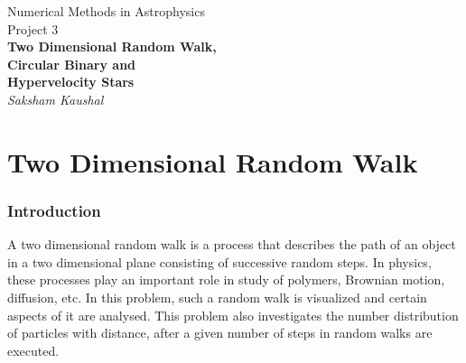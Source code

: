 \documentclass[a4paper]{article}
\begin{document}
	
	
	\begin{titlepage}
		\begin{center}
			\Large Numerical Methods in Astrophysics \\
			\vspace{1cm}
			\huge{
				Project 3 \\
				\vspace{0.5cm}
				\textbf{Two Dimensional Random Walk,}\\
				\textbf{Circular Binary and} \\
				\textbf{Hypervelocity Stars} \\
				\vspace{1cm}
			}
			\Large \emph{Saksham Kaushal}
		\end{center}
	\end{titlepage}
	
	
	\tableofcontents
	\newpage
	
	
	\part{Two Dimensional Random Walk} \label{problem1}
	
		
		\section{Introduction} \label{1:introduction}
		
		A two dimensional random walk is a process that describes the path of an object in a two dimensional plane consisting of successive random steps. In physics, these processes play an important role in study of polymers, Brownian motion, diffusion, etc. In this problem, such a random walk is visualized and certain aspects of it are analysed. This problem also investigates the number distribution of particles with distance, after a given number of steps in random walks are executed.
		
		
\end{document}
